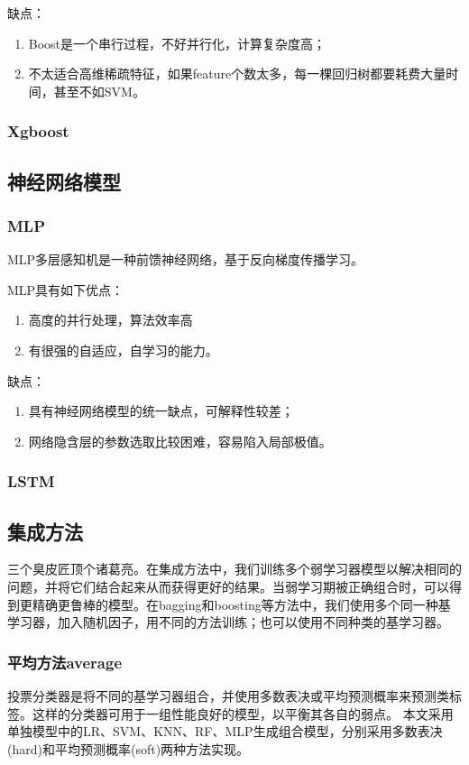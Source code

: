 \documentclass[UTF8]{ctexart}
\begin{document}
缺点：
\begin{enumerate}[(1)]
	\item Boost是一个串行过程，不好并行化，计算复杂度高；
	\item 不太适合高维稀疏特征，如果feature个数太多，每一棵回归树都要耗费大量时间，甚至不如SVM。
	
\end{enumerate}


\subsubsection{Xgboost}


\subsection{神经网络模型}

\subsubsection{MLP}
MLP多层感知机是一种前馈神经网络，基于反向梯度传播学习。

MLP具有如下优点：
\begin{enumerate}[(1)]
	\item 高度的并行处理，算法效率高
	\item 有很强的自适应，自学习的能力。
\end{enumerate}

缺点：
\begin{enumerate}[(1)]
	\item 具有神经网络模型的统一缺点，可解释性较差；
	\item 网络隐含层的参数选取比较困难，容易陷入局部极值。
	
\end{enumerate}


\subsubsection{LSTM}


\subsection{集成方法}
三个臭皮匠顶个诸葛亮。在集成方法中，我们训练多个弱学习器模型以解决相同的问题，并将它们结合起来从而获得更好的结果。当弱学习期被正确组合时，可以得到更精确更鲁棒的模型。在bagging和boosting等方法中，我们使用多个同一种基学习器，加入随机因子，用不同的方法训练；也可以使用不同种类的基学习器。
\subsubsection{平均方法average}
投票分类器是将不同的基学习器组合，并使用多数表决或平均预测概率来预测类标签。这样的分类器可用于一组性能良好的模型，以平衡其各自的弱点。
本文采用单独模型中的LR、SVM、KNN、RF、MLP生成组合模型，分别采用多数表决(hard)和平均预测概率(soft)两种方法实现。
\end{document}
